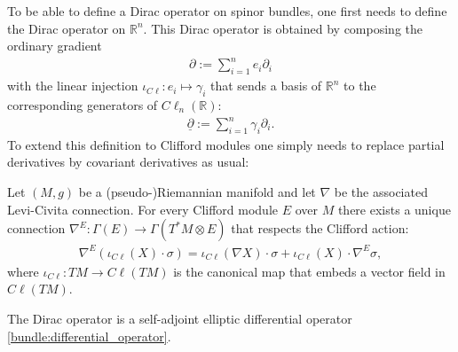     To be able to define a Dirac operator on spinor bundles, one first needs to define the Dirac operator on $\mathbb{R}^n$. This Dirac operator is obtained by composing the ordinary gradient
    \begin{gather}
        \partial:=\sum_{i=1}^ne_i\partial_i
    \end{gather}
    with the linear injection $\iota_{C\ell}:e_i\mapsto\gamma_i$ that sends a basis of $\mathbb{R}^n$ to the corresponding generators of $C\ell_n(\mathbb{R})$:
    \begin{gather}
        \label{riemann:dirac_operator_R}
        \underline{\partial} := \sum_{i=1}^n\gamma_i\partial_i.
    \end{gather}
    To extend this definition to Clifford modules one simply needs to replace partial derivatives by covariant derivatives as usual:
    \begin{property}
        Let $(M,g)$ be a (pseudo-)Riemannian manifold and let $\nabla$ be the associated Levi-Civita connection. For every Clifford module $E$ over $M$ there exists a unique connection $\nabla^E:\Gamma(E)\rightarrow \Gamma(T^*M\otimes E)$ that respects the Clifford action:
        \begin{gather}
            \nabla^E(\iota_{C\ell}(X)\cdot\sigma) = \iota_{C\ell}(\nabla X)\cdot\sigma + \iota_{C\ell}(X)\cdot\nabla^E\sigma,
        \end{gather}
        where $\iota_{C\ell}:TM\rightarrow C\ell(TM)$ is the canonical map that embeds a vector field in $C\ell(TM)$.
    \end{property}

    \begin{property}[Ellipticity]
        The Dirac operator is a self-adjoint elliptic differential operator \ref{bundle:differential_operator}.
    \end{property}

